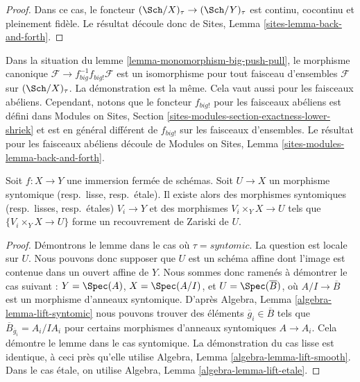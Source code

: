 \begin{proof}
Dans ce cas, le foncteur $(\Sch/X)_\tau \to (\Sch/Y)_\tau$
est continu, cocontinu et pleinement fid\`ele. Le r\'esultat d\'ecoule donc de
Sites, Lemma \ref{sites-lemma-back-and-forth}.
\end{proof}

\begin{remark}
\label{remark-push-pull-shriek}
Dans la situation du
lemme \ref{lemma-monomorphism-big-push-pull},
le morphisme canonique
$\mathcal{F} \to f_{big}^{-1}f_{big!}\mathcal{F}$
est un isomorphisme pour tout faisceau d'ensembles $\mathcal{F}$ sur
$(\Sch/X)_\tau$. La d\'emonstration est la m\^eme. Cela
vaut aussi pour les faisceaux ab\'eliens. Cependant, notons
que le foncteur $f_{big!}$ pour les faisceaux ab\'eliens est d\'efini dans
Modules on Sites, Section \ref{sites-modules-section-exactness-lower-shriek}
et est en g\'en\'eral diff\'erent de $f_{big!}$ sur les faisceaux d'ensembles.
Le r\'esultat pour les faisceaux ab\'eliens d\'ecoule de
Modules on Sites, Lemma \ref{sites-modules-lemma-back-and-forth}.
\end{remark}

\begin{lemma}
\label{lemma-closed-immersion-cover-from-below}
Soit $f : X \to Y$ une immersion ferm\'ee de sch\'emas.
Soit $U \to X$ un morphisme syntomique (resp.\ lisse, resp.\ \'etale).
Il existe alors des morphismes syntomiques (resp.\ lisses, resp.\ \'etales)
$V_i \to Y$ et des morphismes $V_i \times_Y X \to U$ tels que
$\{V_i \times_Y X \to U\}$ forme un recouvrement de Zariski de $U$.
\end{lemma}

\begin{proof}
D\'emontrons le lemme dans le cas o\`u $\tau = syntomic$.
La question est locale sur $U$. Nous pouvons donc supposer que $U$ est
un sch\'ema affine dont l'image est contenue dans un ouvert affine de $Y$.
Nous sommes donc ramen\'es \`a d\'emontrer le cas suivant :
$Y = \Spec(A)$, $X = \Spec(A/I)$, et
$U = \Spec(\overline{B})$, o\`u
$A/I \to \overline{B}$ est un morphisme d'anneaux syntomique.
D'apr\`es Algebra, Lemma \ref{algebra-lemma-lift-syntomic}
nous pouvons trouver des \'el\'ements $\overline{g}_i \in \overline{B}$
tels que
$\overline{B}_{\overline{g}_i} = A_i/IA_i$ pour certains morphismes d'anneaux syntomiques
$A \to A_i$.
Cela d\'emontre le lemme dans le cas syntomique.
La d\'emonstration du cas lisse est identique, \`a ceci pr\`es qu'elle utilise
Algebra, Lemma \ref{algebra-lemma-lift-smooth}.
Dans le cas \'etale, on utilise
Algebra, Lemma \ref{algebra-lemma-lift-etale}.
\end{proof}

